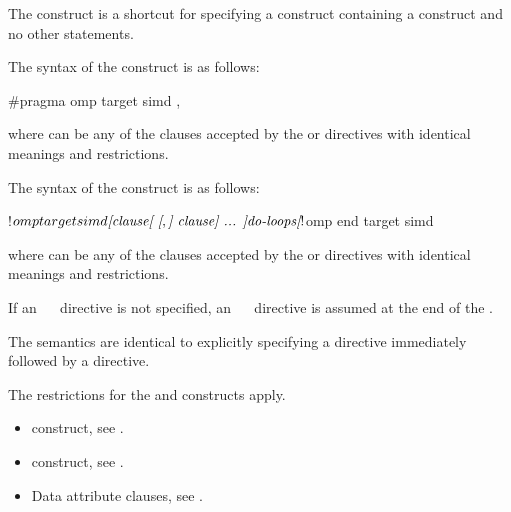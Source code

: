 \summary
The   construct is a shortcut for specifying a 
construct containing a  construct and no other statements.

\syntax
\begin{ccppspecific}
The syntax of the   construct is as follows:

\begin{ompcPragma}
#pragma omp target simd \plc{[clause[ [},\plc{] clause] ... ] new-line}
\end{ompcPragma}

where  can be any of the clauses accepted by the  or
 directives with identical meanings and restrictions.

\end{ccppspecific}

\begin{fortranspecific}
The syntax of the   construct is as follows:

\begin{ompfPragma}
!$omp target simd \plc{[clause[ [},\plc{] clause] ... ]}
    \plc{do-loops}
\plc{[}!$omp end target simd\plc{]}
\end{ompfPragma}

where  can be any of the clauses accepted by the  or
 directives with identical meanings and restrictions.

If an ~~ directive is not specified, an
~~ directive is assumed at the end of
the .
\end{fortranspecific}

\descr
The semantics are identical to explicitly specifying a  directive
immediately followed by a  directive.

\restrictions

The restrictions for the  and  constructs apply.

\crossreferences
\begin{itemize}
\item {} construct, see
.

\item {} construct, see
.

\item Data attribute clauses, see
.
\end{itemize}









